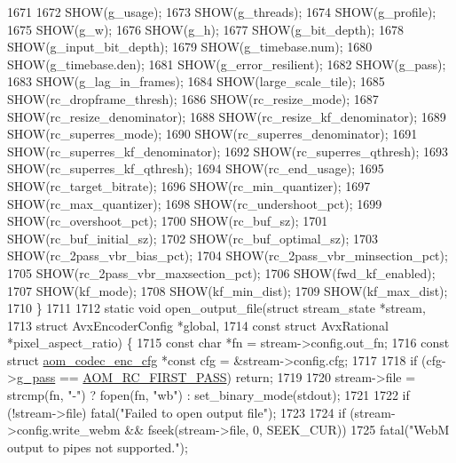 \begin{DoxyCodeInclude}
{{{{{{{{{{{{{{{{{{{{{{{{{{{{{{{1671 
1672   SHOW(g\_usage);
1673   SHOW(g\_threads);
1674   SHOW(g\_profile);
1675   SHOW(g\_w);
1676   SHOW(g\_h);
1677   SHOW(g\_bit\_depth);
1678   SHOW(g\_input\_bit\_depth);
1679   SHOW(g\_timebase.num);
1680   SHOW(g\_timebase.den);
1681   SHOW(g\_error\_resilient);
1682   SHOW(g\_pass);
1683   SHOW(g\_lag\_in\_frames);
1684   SHOW(large\_scale\_tile);
1685   SHOW(rc\_dropframe\_thresh);
1686   SHOW(rc\_resize\_mode);
1687   SHOW(rc\_resize\_denominator);
1688   SHOW(rc\_resize\_kf\_denominator);
1689   SHOW(rc\_superres\_mode);
1690   SHOW(rc\_superres\_denominator);
1691   SHOW(rc\_superres\_kf\_denominator);
1692   SHOW(rc\_superres\_qthresh);
1693   SHOW(rc\_superres\_kf\_qthresh);
1694   SHOW(rc\_end\_usage);
1695   SHOW(rc\_target\_bitrate);
1696   SHOW(rc\_min\_quantizer);
1697   SHOW(rc\_max\_quantizer);
1698   SHOW(rc\_undershoot\_pct);
1699   SHOW(rc\_overshoot\_pct);
1700   SHOW(rc\_buf\_sz);
1701   SHOW(rc\_buf\_initial\_sz);
1702   SHOW(rc\_buf\_optimal\_sz);
1703   SHOW(rc\_2pass\_vbr\_bias\_pct);
1704   SHOW(rc\_2pass\_vbr\_minsection\_pct);
1705   SHOW(rc\_2pass\_vbr\_maxsection\_pct);
1706   SHOW(fwd\_kf\_enabled);
1707   SHOW(kf\_mode);
1708   SHOW(kf\_min\_dist);
1709   SHOW(kf\_max\_dist);
1710 \}
1711 
1712 \textcolor{keyword}{static} \textcolor{keywordtype}{void} open\_output\_file(\textcolor{keyword}{struct} stream\_state *stream,
1713                              \textcolor{keyword}{struct} AvxEncoderConfig *global,
1714                              \textcolor{keyword}{const} \textcolor{keyword}{struct} AvxRational *pixel\_aspect\_ratio) \{
1715   \textcolor{keyword}{const} \textcolor{keywordtype}{char} *fn = stream->config.out\_fn;
1716   \textcolor{keyword}{const} \textcolor{keyword}{struct }\hyperlink{structaom__codec__enc__cfg}{aom\_codec\_enc\_cfg} *\textcolor{keyword}{const} cfg = &stream->config.cfg;
1717 
1718   \textcolor{keywordflow}{if} (cfg->\hyperlink{structaom__codec__enc__cfg_aad58e4d10c7904d50ce959aef202dc64}{g\_pass} == \hyperlink{group__encoder_gga92b6709b58dc3435e3ba652da562eda1ad342b33a290482c20238bfde5d9bea1e}{AOM\_RC\_FIRST\_PASS}) \textcolor{keywordflow}{return};
1719 
1720   stream->file = strcmp(fn, \textcolor{stringliteral}{"-"}) ? fopen(fn, \textcolor{stringliteral}{"wb"}) : set\_binary\_mode(stdout);
1721 
1722   \textcolor{keywordflow}{if} (!stream->file) fatal(\textcolor{stringliteral}{"Failed to open output file"});
1723 
1724   \textcolor{keywordflow}{if} (stream->config.write\_webm && fseek(stream->file, 0, SEEK\_CUR))
1725     fatal(\textcolor{stringliteral}{"WebM output to pipes not supported."});
}}}}}}}}}}}}}}}}}}}}}}}}}}}}}}}
\end{DoxyCodeInclude}
